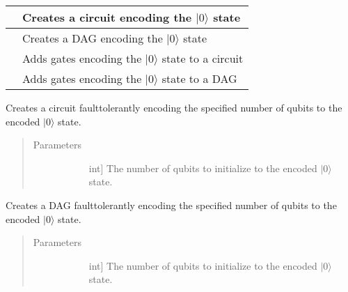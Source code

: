 \documentclass[letterpaper,10pt,english]{sphinxmanual}
\begin{document}
\begin{fulllineitems}
\begin{savenotes}
\begin{tabulary}{\linewidth}[t]{|T|T|}
&
Creates a circuit encoding the \(|0\rangle\) state
\\
\hline
{}
&
Creates a DAG encoding the \(|0\rangle\) state
\\
\hline
{}
&
Adds gates encoding the \(|0\rangle\) state to a circuit
\\
\hline
{}
&
Adds gates encoding the \(|0\rangle\) state to a DAG
\\
\hline
\end{tabulary}
\par
\sphinxattableend\end{savenotes}

\begin{fulllineitems}
\label{\detokenize{Base:BaseFaultTolerance.FaultTolerantEncoder.createEncoderCircuit}}
Creates a circuit fault\sphinxhyphen{}tolerantly encoding the specified number of qubits to the encoded \(|0\rangle\) state.
\begin{quote}\begin{description}
\item[{Parameters}] \leavevmode\begin{description}
\item[{}] \leavevmode{[}int{]}
The number of qubits to initialize to the encoded \(|0\rangle\) state.

\end{description}

\end{description}\end{quote}

\end{fulllineitems}


\begin{fulllineitems}
\label{\detokenize{Base:BaseFaultTolerance.FaultTolerantEncoder.createEncoderDag}}
Creates a DAG fault\sphinxhyphen{}tolerantly encoding the specified number of qubits to the encoded \(|0\rangle\) state.
\begin{quote}\begin{description}
\item[{Parameters}] \leavevmode\begin{description}
\item[{}] \leavevmode{[}int{]}
The number of qubits to initialize to the encoded \(|0\rangle\) state.


\end{description}
\end{description}
\end{quote}
\end{fulllineitems}
\end{fulllineitems}
\end{document}

